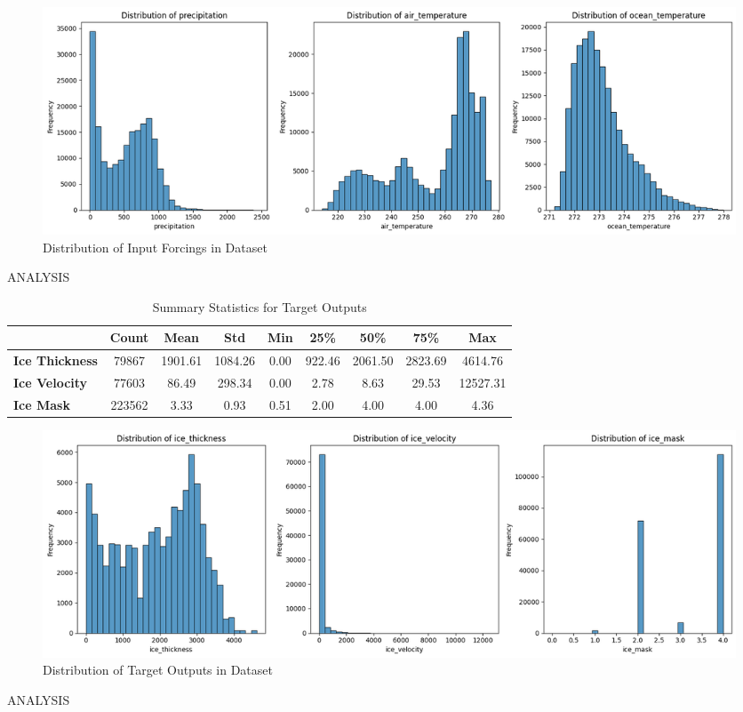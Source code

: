\documentclass[11pt, a4paper, twoside, openright]{report}
\begin{document}
\begin{figure}
  \centering
  \includegraphics[width=1.04\textwidth]{images/input_forcing_distributions.png}
  \caption{Distribution of Input Forcings in Dataset}
  \label{fig:example-image}
\end{figure}

ANALYSIS

\begin{table}
  \centering
  \caption{Summary Statistics for Target Outputs}
  \begin{tabular}{lcccccccc}
      \toprule
      & \textbf{Count} & \textbf{Mean} & \textbf{Std} & \textbf{Min} & \textbf{25\%} & \textbf{50\%} & \textbf{75\%} & \textbf{Max} \\
      \midrule
      \textbf{Ice Thickness} & 79867 & 1901.61 & 1084.26 & 0.00 & 922.46 & 2061.50 & 2823.69 & 4614.76 \\
      \textbf{Ice Velocity}  & 77603 & 86.49 & 298.34 & 0.00 & 2.78 & 8.63 & 29.53 & 12527.31 \\
      \textbf{Ice Mask}      & 223562 & 3.33 & 0.93 & 0.51 & 2.00 & 4.00 & 4.00 & 4.36 \\
      \bottomrule
  \end{tabular}
\end{table}

\begin{figure}
  \centering
  \includegraphics[width=1.02\textwidth]{images/target_output_distributions.png}
  \caption{Distribution of Target Outputs in Dataset}
  \label{fig:example-image}
\end{figure}

ANALYSIS
\end{document}
